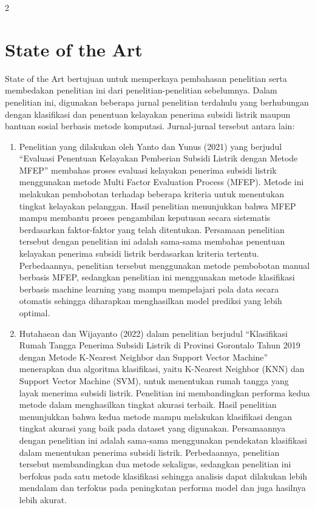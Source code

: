 \documentclass[12pt, a4paper, onecolumn, oneside]{report}
\begin{document}
\begin{spacing}{2}
\section{State of the Art}
State of the Art bertujuan untuk memperkaya pembahasan penelitian serta membedakan penelitian ini dari penelitian-penelitian sebelumnya. Dalam penelitian ini, digunakan beberapa jurnal penelitian terdahulu yang berhubungan dengan klasifikasi dan penentuan kelayakan penerima subsidi listrik maupun bantuan sosial berbasis metode komputasi. Jurnal-jurnal tersebut antara lain:
\begin{enumerate}
    \item Penelitian yang dilakukan oleh Yanto dan Yunus (2021) yang berjudul ``Evaluasi Penentuan Kelayakan Pemberian Subsidi Listrik dengan Metode MFEP'' membahas proses evaluasi kelayakan penerima subsidi listrik menggunakan metode Multi Factor Evaluation Process (MFEP). Metode ini melakukan pembobotan terhadap beberapa kriteria untuk menentukan tingkat kelayakan pelanggan. Hasil penelitian menunjukkan bahwa MFEP mampu membantu proses pengambilan keputusan secara sistematis berdasarkan faktor-faktor yang telah ditentukan. Persamaan penelitian tersebut dengan penelitian ini adalah sama-sama membahas penentuan kelayakan penerima subsidi listrik berdasarkan kriteria tertentu. Perbedaannya, penelitian tersebut menggunakan metode pembobotan manual berbasis MFEP, sedangkan penelitian ini menggunakan metode klasifikasi berbasis machine learning yang mampu mempelajari pola data secara otomatis sehingga diharapkan menghasilkan model prediksi yang lebih optimal.
    \item Hutahaean dan Wijayanto (2022) dalam penelitian berjudul ``Klasifikasi Rumah Tangga Penerima Subsidi Listrik di Provinsi Gorontalo Tahun 2019 dengan Metode K-Nearest Neighbor dan Support Vector Machine'' menerapkan dua algoritma klasifikasi, yaitu K-Nearest Neighbor (KNN) dan Support Vector Machine (SVM), untuk menentukan rumah tangga yang layak menerima subsidi listrik. Penelitian ini membandingkan performa kedua metode dalam menghasilkan tingkat akurasi terbaik. Hasil penelitian menunjukkan bahwa kedua metode mampu melakukan klasifikasi dengan tingkat akurasi yang baik pada dataset yang digunakan. Persamaannya dengan penelitian ini adalah sama-sama menggunakan pendekatan klasifikasi dalam menentukan penerima subsidi listrik. Perbedaannya, penelitian tersebut membandingkan dua metode sekaligus, sedangkan penelitian ini berfokus pada satu metode klasifikasi sehingga analisis dapat dilakukan lebih mendalam dan terfokus pada peningkatan performa model dan juga hasilnya lebih akurat.

\end{enumerate}
\end{spacing}
\end{document}
